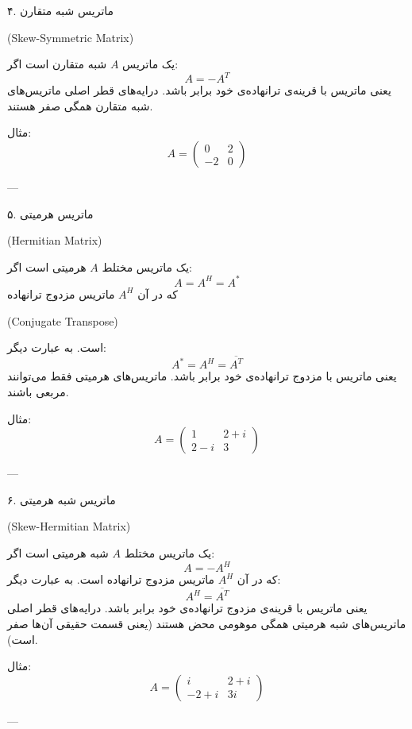	\begin{definition}
		 ۴. ماتریس شبه متقارن \begin{latin}
		 	(Skew-Symmetric Matrix)
		 \end{latin}
	یک ماتریس \( A \) شبه متقارن است اگر:
	\[
	A = -A^T
	\]
	یعنی ماتریس با قرینه‌ی ترانهاده‌ی خود برابر باشد. درایه‌های قطر اصلی ماتریس‌های شبه متقارن همگی صفر هستند.
	
	 مثال:
	\[
	A = \begin{pmatrix}
		0 & 2 \\
		-2 & 0
	\end{pmatrix}
	\]
	
	---
	\end{definition}
	\begin{definition}
		
	 ۵. ماتریس هرمیتی 
\begin{latin}
(Hermitian Matrix)
\end{latin}
	یک ماتریس مختلط \( A \) هرمیتی است اگر:
	\[
	A = A^H=A^*
	\]
	که در آن \( A^H \) ماتریس مزدوج ترانهاده
	\begin{latin}
		 (Conjugate Transpose)
	\end{latin}
	 است. به عبارت دیگر:
	\[
A^*=A^H = \overline{A^T}
	\]
	یعنی ماتریس با مزدوج ترانهاده‌ی خود برابر باشد. ماتریس‌های هرمیتی فقط می‌توانند مربعی باشند.
	
	 مثال:
	\[
	A = \begin{pmatrix}
		1 & 2 + i \\
		2 - i & 3
	\end{pmatrix}
	\]
	
	---
	\end{definition}
	\begin{definition}
		
	 ۶. ماتریس شبه هرمیتی \begin{latin}
	 	(Skew-Hermitian Matrix)
	 \end{latin}
	یک ماتریس مختلط \( A \) شبه هرمیتی است اگر:
	\[
	A = -A^H
	\]
	که در آن \( A^H \) ماتریس مزدوج ترانهاده است. به عبارت دیگر:
	\[
	A^H = \overline{A^T}
	\]
	یعنی ماتریس با قرینه‌ی مزدوج ترانهاده‌ی خود برابر باشد. درایه‌های قطر اصلی ماتریس‌های شبه هرمیتی همگی موهومی محض هستند (یعنی قسمت حقیقی آن‌ها صفر است).
	
	 مثال:
	\[
	A = \begin{pmatrix}
		i & 2 + i \\
		-2 + i & 3i
	\end{pmatrix}
	\]
	
	---
	
	\end{definition}
